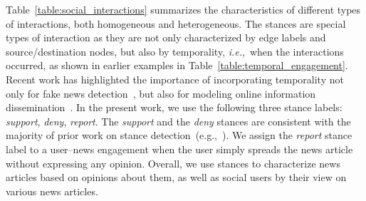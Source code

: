 \documentclass[sigconf,anonymous]{acmart}
\theoremstyle{definition}
\theoremstyle{hypothesis}
\begin{document}
Table~\ref{table:social_interactions} summarizes the characteristics of different types of interactions, both homogeneous and heterogeneous. 
The stances are special types of interaction as they are not only characterized by edge labels and source/destination nodes, but also by temporality, \textit{i.e.},~when the interactions occurred, as shown in earlier examples in Table~\ref{table:temporal_engagement}. Recent work has highlighted the importance of incorporating temporality not only for fake news detection~\cite{ruchansky2017csi,ma2015detect}, but also for modeling online information dissemination~\cite{he2014predicting}. In the present work, we use the following three stance labels: \textit{support}, \textit{deny}, \textit{report}. The \textit{support} and the \textit{deny} stances are consistent with the majority of prior work on stance detection~(e.g.,~\cite{mohtarami2018automatic}). We assign the \emph{report} stance label to a user--news engagement when the user simply spreads the news article without expressing any opinion. Overall, we use stances to characterize news articles based on opinions about them, as well as social users by their view on various news articles.


\end{document}
